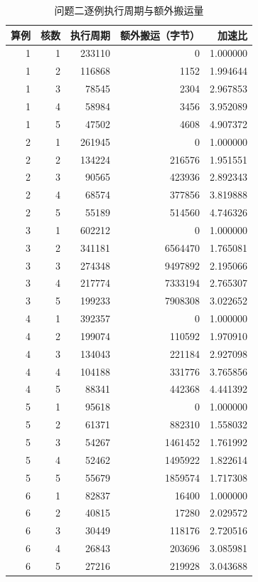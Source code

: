 \begin{longtable}{rrrrr}
\caption{问题二逐例执行周期与额外搬运量}\label{tab:q2-full-appendix}\\
\toprule
算例 & 核数 & 执行周期 & 额外搬运（字节） & 加速比 \\
\midrule\endhead
1 & 1 & 233110 & 0 & 1.000000 \\
1 & 2 & 116868 & 1152 & 1.994644 \\
1 & 3 & 78545 & 2304 & 2.967853 \\
1 & 4 & 58984 & 3456 & 3.952089 \\
1 & 5 & 47502 & 4608 & 4.907372 \\
2 & 1 & 261945 & 0 & 1.000000 \\
2 & 2 & 134224 & 216576 & 1.951551 \\
2 & 3 & 90565 & 423936 & 2.892343 \\
2 & 4 & 68574 & 377856 & 3.819888 \\
2 & 5 & 55189 & 514560 & 4.746326 \\
3 & 1 & 602212 & 0 & 1.000000 \\
3 & 2 & 341181 & 6564470 & 1.765081 \\
3 & 3 & 274348 & 9497892 & 2.195066 \\
3 & 4 & 217774 & 7333194 & 2.765307 \\
3 & 5 & 199233 & 7908308 & 3.022652 \\
4 & 1 & 392357 & 0 & 1.000000 \\
4 & 2 & 199074 & 110592 & 1.970910 \\
4 & 3 & 134043 & 221184 & 2.927098 \\
4 & 4 & 104188 & 331776 & 3.765856 \\
4 & 5 & 88341 & 442368 & 4.441392 \\
5 & 1 & 95618 & 0 & 1.000000 \\
5 & 2 & 61371 & 882310 & 1.558032 \\
5 & 3 & 54267 & 1461452 & 1.761992 \\
5 & 4 & 52462 & 1495922 & 1.822614 \\
5 & 5 & 55679 & 1859574 & 1.717308 \\
6 & 1 & 82837 & 16400 & 1.000000 \\
6 & 2 & 40815 & 17280 & 2.029572 \\
6 & 3 & 30449 & 118176 & 2.720516 \\
6 & 4 & 26843 & 203696 & 3.085981 \\
6 & 5 & 27216 & 219928 & 3.043688 \\

\end{longtable}
